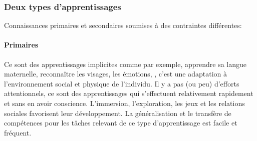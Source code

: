         \subsubsection{Deux types d’apprentissages}
            Connaissances primaires et secondaires soumises à des contraintes différentes:
            \paragraph{Primaires}
                Ce sont des apprentissages implicites comme par exemple, apprendre sa langue maternelle, reconnaître les visages, les émotions, \etc, c'est une adaptation à l’environnement social et physique de l'individu. Il y a pas (ou peu) d’efforts attentionnels, ce sont des apprentissages qui s'effectuent relativement rapidement et sans en avoir conscience. L'immersion, l’exploration, les jeux et les relations sociales favorisent leur développement. La généralisation et le transfère de compétences pour les tâches relevant de ce type d'apprentissage est facile et fréquent.
